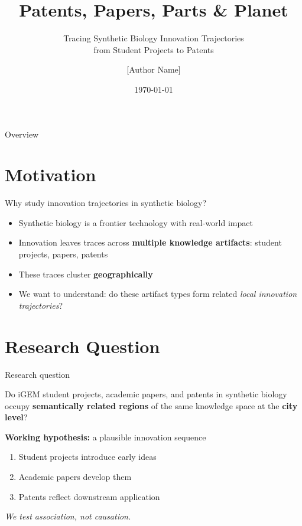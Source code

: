 \documentclass[aspectratio=169, 12pt]{beamer}
\title{Patents, Papers, Parts \& Planet}
\subtitle{Tracing Synthetic Biology Innovation Trajectories\\from Student Projects to Patents}
\author{[Author Name]}
\institute{CSH Vienna / TU Straubing}
\date{\today}
\begin{document}

\maketitle

\begin{frame}{Overview}
  \tableofcontents
\end{frame}

\section{Motivation}

\begin{frame}{Why study innovation trajectories in synthetic biology?}
  \begin{itemize}
    \item Synthetic biology is a frontier technology with real-world impact
    \item Innovation leaves traces across \textbf{multiple knowledge artifacts}:
      student projects, papers, patents
    \item These traces cluster \textbf{geographically}
    \item We want to understand: do these artifact types form related
      \emph{local innovation trajectories}?
  \end{itemize}
\end{frame}

\section{Research Question}

\begin{frame}{Research question}
  \begin{block}{}
    \Large Do iGEM student projects, academic papers, and patents in synthetic
    biology occupy \textbf{semantically related regions} of the same knowledge
    space at the \textbf{city level}?
  \end{block}

  \vspace{1em}
  \textbf{Working hypothesis:} a plausible innovation sequence
  \begin{enumerate}
    \item Student projects introduce early ideas
    \item Academic papers develop them
    \item Patents reflect downstream application
  \end{enumerate}

  \vspace{1em}
  \textit{We test association, not causation.}
\end{frame}
\end{document}

